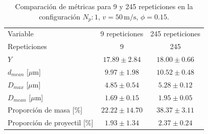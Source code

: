 \begin{table}[H]
    \centering
    \caption{Comparación de métricas para 9 y 245 repeticiones en la configuración \(N_p:1\), \(v=50\,\text{m/s}\), \(\phi=0.15\).}
    \label{tab:estadistica_comparativa}
    \begin{tabular}{lcc}
    \hline
    Variable & 9 repeticiones & 245 repeticiones \\
    Repeticiones & 9 & 245 \\
    \hline
    \hline
    $Y$ & $17.89\pm2.84$ & $18.00\pm0.66$ \\
    $d_{mean}$ [\(\mu\text{m}\)] & $9.97\pm1.98$ & $10.52\pm0.48$ \\
    $D_{max}$ [\(\mu\text{m}\)] & $4.85\pm0.54$ & $5.28\pm0.12$ \\
    $D_{mean}$ [\(\mu\text{m}\)] & $1.69\pm0.15$ & $1.95\pm0.05$ \\
    Proporci\'on de masa [\%] & $22.22\pm14.70$ & $38.37\pm3.11$ \\
    Proporci\'on de proyectil [\%] & $1.93\pm1.34$ & $2.37\pm0.24$ \\
    \hline
    \end{tabular}
\end{table}